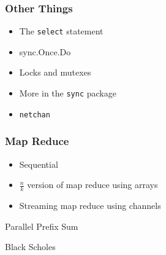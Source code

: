 \documentclass{beamer}
\begin{document}
\begin{frame} [fragile]
\frametitle{Other Things}
\begin{itemize}
\item The \verb=select= statement
\item sync.Once.Do
\item Locks and mutexes
\item More in the \verb=sync= package
\item \verb=netchan= 
\end{itemize}
\end{frame}


\begin{frame}[fragile] 
\frametitle{Map Reduce}
\begin{itemize}
  \item Sequential
  \item $\frac{n}{k}$ version of map reduce using arrays
  \item Streaming map reduce using channels
\end{itemize}
\end{frame}

\begin{frame} {Parallel Prefix Sum}
\end{frame}

\begin{frame} {Black Scholes}
\end{frame}
\end{document}

